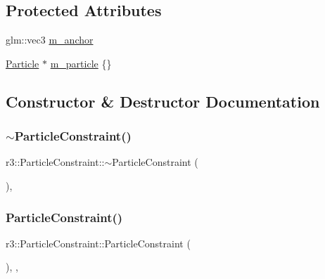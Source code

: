 \subsection*{Protected Attributes}
\begin{DoxyCompactItemize}
\item 
glm\+::vec3 \mbox{\hyperlink{classr3_1_1_particle_constraint_a71ad1de9d86203dbd27059107dc40a9b}{m\+\_\+anchor}}
\item 
\mbox{\hyperlink{classr3_1_1_particle}{Particle}} $\ast$ \mbox{\hyperlink{classr3_1_1_particle_constraint_ad6a80699b1e0579c4a307f3a7ac49d26}{m\+\_\+particle}} \{\}
\end{DoxyCompactItemize}


\subsection{Constructor \& Destructor Documentation}
\mbox{\label{classr3_1_1_particle_constraint_aa4c9c88384c10a9e9613bdad843df524}} 
\subsubsection{\texorpdfstring{$\sim$\+Particle\+Constraint()}{~ParticleConstraint()}}
{\footnotesize\ttfamily r3\+::\+Particle\+Constraint\+::$\sim$\+Particle\+Constraint (\begin{DoxyParamCaption}{ }\end{DoxyParamCaption})\hspace{0.3cm}{\ttfamily [virtual]}, {\ttfamily [default]}}

\mbox{\label{classr3_1_1_particle_constraint_af158845ecce7f53246f6120ad9dbd4b8}} 
\subsubsection{\texorpdfstring{Particle\+Constraint()}{ParticleConstraint()}}
{\footnotesize\ttfamily r3\+::\+Particle\+Constraint\+::\+Particle\+Constraint (\begin{DoxyParamCaption}{ }\end{DoxyParamCaption})\hspace{0.3cm}{\ttfamily [explicit]}, {\ttfamily [protected]}, {\ttfamily [default]}}



